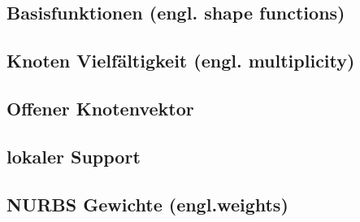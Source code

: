 \documentclass[german,a4paper,12pt,oneside]{scrbook}
\theoremstyle{definition}
\theoremstyle{definition}
\theoremstyle{definition}
\theoremstyle{definition}
\theoremstyle{definition}
\theoremstyle{definition}
\begin{document}
\subsection{Basisfunktionen (engl. shape functions)}



\subsection{Knoten Vielfältigkeit (engl. multiplicity)}

\subsection{Offener Knotenvektor}

\subsection{lokaler Support}

\subsection{NURBS Gewichte (engl.weights)}
\end{document}
